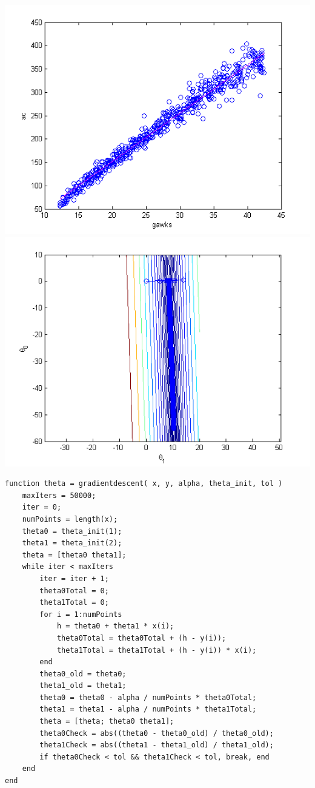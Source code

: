 \documentclass{article}
\begin{document}
\begin{enumerate}
	\includegraphics[width=\linewidth/2]{../images/GradientDescent} \includegraphics[width=\linewidth/2]{../images/GradientContour}\\

\bigskip

\begin{lstlisting}   
function theta = gradientdescent( x, y, alpha, theta_init, tol )
    maxIters = 50000;
    iter = 0;
    numPoints = length(x);
    theta0 = theta_init(1);
    theta1 = theta_init(2);
    theta = [theta0 theta1];
    while iter < maxIters
        iter = iter + 1;
        theta0Total = 0;
        theta1Total = 0;
        for i = 1:numPoints
            h = theta0 + theta1 * x(i);
            theta0Total = theta0Total + (h - y(i));
            theta1Total = theta1Total + (h - y(i)) * x(i);
        end
        theta0_old = theta0;
        theta1_old = theta1;
        theta0 = theta0 - alpha / numPoints * theta0Total;
        theta1 = theta1 - alpha / numPoints * theta1Total;
        theta = [theta; theta0 theta1];
        theta0Check = abs((theta0 - theta0_old) / theta0_old);
        theta1Check = abs((theta1 - theta1_old) / theta1_old);
        if theta0Check < tol && theta1Check < tol, break, end
    end
end
\end{lstlisting}


\end{enumerate}
\end{document}
